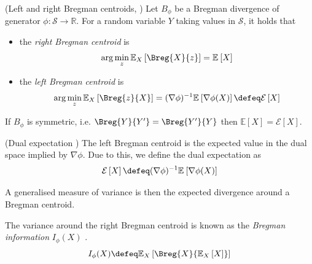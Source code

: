 \documentclass[
	twoside=false, %
]{kaobook}
\begin{document}
\begin{lemma} (Left and right Bregman centroids, \cite{pfau_GeneralizedBiasVarianceDecomposition_})
  \label{thm:bregman-centroids}
    Let $B_{\phi}$ be a Bregman divergence of generator $\phi: \mathcal{S} \to \mathbb{R}$. For a random variable $Y$ taking values in $\mathcal{S}$, it holds that
\begin{itemize}
    \item the \textit{right Bregman centroid} is $$\arg \min_z \mathbb{E}_{X}\left[ \Breg{X}{z}  \right] = \mathbb{E}_{}\left[ X \right]$$
    \item the \textit{left Bregman centroid} is $$\arg\min_{z}  \mathbb{E}_{X}\left[ \Breg{z}{X}\right] = (\nabla \phi)^{-1} \mathbb{E}_{}\left[ \nabla \phi(X) \right] \defeq \mathcal{E}\left[X\right]$$
\end{itemize}
  If $B_\phi$ is symmetric, i.e. $\Breg{Y}{Y'} = \Breg{Y'}{Y}$ then $\mathbb{E}\left[X\right] = \mathcal{E}\left[X\right]$.
\end{lemma}
\begin{definition} (Dual expectation \cite{pfau_GeneralizedBiasVarianceDecomposition_})
  \label{def:dual-expectation}
  The left Bregman centroid is the expected value in the dual space implied by $\nabla\phi$. Due to this, we define the dual expectation as  
  $$\mathcal{E}\left[X\right] \defeq (\nabla \phi)^{-1}\mathbb{E}_{}\left[ \nabla \phi(X) \right]$$ 
\end{definition}


A generalised measure of variance is then the expected divergence around a Bregman centroid.

\begin{definition}
	\label{def:bregman-information}
	The variance around the right Bregman centroid is known as the 
	\textit{Bregman information} 
  $I_{\phi}(X)$
  \cite{banerjee_ClusteringBregmanDivergences_2004}.
$$
I_{\phi}(X) \defeq \mathbb{E}_{X}\left[ \Breg{X}{\mathbb{E}_X\left[ X \right] } \right] 
$$
\end{definition}
\end{document}
